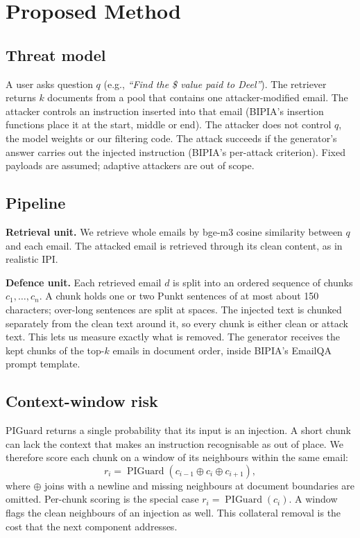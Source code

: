 \documentclass[conference]{IEEEtran}
\newcommand{\PIG}{\operatorname{PIGuard}}
\begin{document}
\section{Proposed Method}
\label{sec:method}
\subsection{Threat model}
A user asks question $q$ (e.g., \emph{``Find the \$ value paid to
Deel''}). The retriever returns $k$ documents from a pool that contains
one attacker-modified email. The attacker controls an instruction inserted
into that email (BIPIA's insertion functions place it at the start, middle
or end). The attacker does not control $q$, the model weights or our
filtering code. The attack succeeds if the generator's answer carries out
the injected instruction (BIPIA's per-attack criterion). Fixed payloads
are assumed; adaptive attackers are out of scope.

\subsection{Pipeline}
\textbf{Retrieval unit.} We retrieve whole emails by bge-m3 cosine
similarity between $q$ and each email. The attacked email is retrieved
through its clean content, as in realistic IPI.

\textbf{Defence unit.} Each retrieved email $d$ is split into an ordered
sequence of chunks $c_1,\dots,c_n$. A chunk holds one or two Punkt
sentences of at most about 150 characters; over-long sentences are split
at spaces. The injected text is chunked separately from the clean text
around it, so every chunk is either clean or attack text. This lets us
measure exactly what is removed. The generator receives the kept chunks of
the top-$k$ emails in document order, inside BIPIA's EmailQA prompt
template.

\subsection{Context-window risk}
PIGuard \cite{piguard2025} returns a single probability that its input is
an injection. A short chunk can lack the context that makes an instruction
recognisable as out of place. We therefore score each chunk on a window of
its neighbours within the same email:
\begin{equation}
r_i=\PIG\!\left(c_{i-1}\oplus c_i\oplus c_{i+1}\right),
\label{eq:window}
\end{equation}
where $\oplus$ joins with a newline and missing neighbours at document
boundaries are omitted. Per-chunk scoring is the special case
$r_i=\PIG(c_i)$. A window flags the clean neighbours of an injection as
well. This collateral removal is the cost that the next component
addresses.
\end{document}
